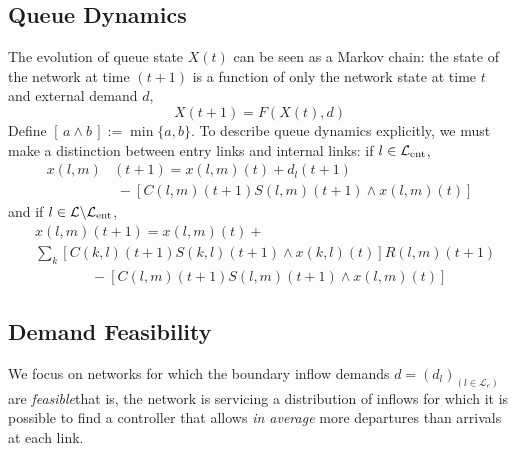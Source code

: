 \subsection*{Queue Dynamics}
The evolution of queue state $X(t)$ can be seen as a Markov chain: the state of the network at time $(t+1)$ is a function of only the network state at time $t$ and external demand $d$,
\begin{equation}
X(t+1) = F(X(t),d)
\end{equation}
Define $[\,a \wedge b\,]:=\min\{a,b\}$. To describe queue dynamics explicitly, we must make a distinction between entry links and internal links: if $l\in \mathcal{L}_{\text{ent}}$,
\begin{align} \label{entrydynamics}
x(l,m)&(t+1) = x(l,m)(t) + d_{l}(t+1) \\ &  \;  - [C(l,m)(t+1)S(l,m)(t+1) \wedge x(l,m)(t)] \nonumber 
\end{align}
and if $l\in \mathcal{L}\backslash\mathcal{L}_{\text{ent}}$,
\begin{align}\label{internaldynamics}
&x(l,m)(t+1) = x(l,m)(t) + \\ \nonumber
& \sum_{k}[C(k,l)(t+1)S(k,l)(t+1) \wedge x(k,l)(t)]R(l,m)(t+1) \\ \nonumber 
&\qquad  \qquad- [C(l,m)(t+1)S(l,m)(t+1) \wedge x(l,m)(t)] 
\end{align} 

\vspace{-.5em}
\subsection*{Demand Feasibility}
We focus on networks for which the boundary inflow demands $d = (d_{l})_{(l\in \mathcal{L}_{e})}$ are \emph{feasible}\textemdash that is, the network is servicing a distribution of inflows for which it is possible to find a controller that allows \textit{in average} more departures than arrivals at each link. 


